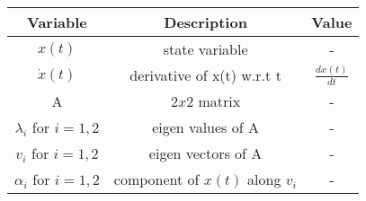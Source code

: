 \begin{tabular}{|c|c|c|} 
      \hline
\textbf{Variable}& \textbf{Description}& \textbf{Value}\\\hline
	 ${x}(t)$ & state variable & - \\\hline
         $\dot{{x}}(t)$ & derivative of x(t) w.r.t t & $\frac{d{x}(t)}{dt}$\\\hline  
         A & $2x2$ matrix & -\\\hline
         $\lambda _i$ for $i = 1, 2$ & eigen values of A & - \\\hline
         $v_i$ for $i = 1, 2$ & eigen vectors of A & - \\\hline
         $\alpha _i$ for $i = 1, 2$ & component of $x(t)$ along $v_i$ & - \\\hline
    \end{tabular}
